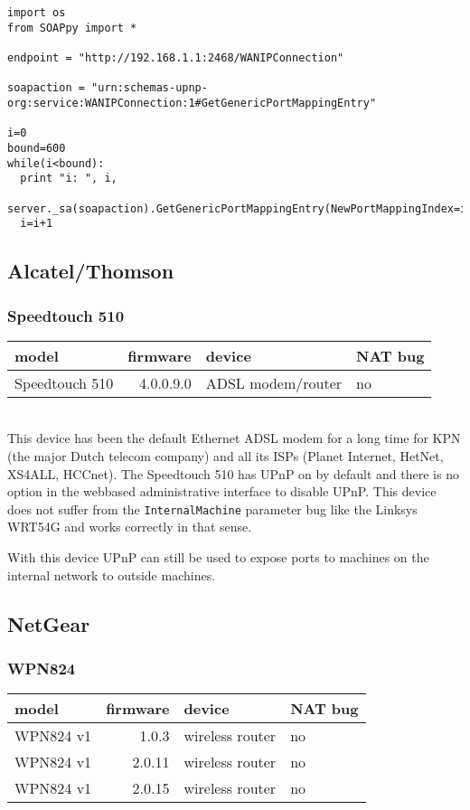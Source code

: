 \documentclass[10pt]{article}
\begin{document}
\begin{verbatim}
import os
from SOAPpy import *

endpoint = "http://192.168.1.1:2468/WANIPConnection"

soapaction = "urn:schemas-upnp-org:service:WANIPConnection:1#GetGenericPortMappingEntry"

i=0
bound=600
while(i<bound):
  print "i: ", i,
    server._sa(soapaction).GetGenericPortMappingEntry(NewPortMappingIndex=i)
  i=i+1
\end{verbatim}


\subsection{Alcatel/Thomson}

\subsubsection{Speedtouch 510}

\begin{tabular}{|l|r|l|l|}
\hline
model & firmware & device & NAT bug \\
\hline
Speedtouch 510 & 4.0.0.9.0 & ADSL modem/router & no \\
\hline
\end{tabular} \\

This device has been the default Ethernet ADSL modem for a long time for
KPN (the major Dutch telecom company) and all its ISPs (Planet Internet,
HetNet, XS4ALL, HCCnet). The Speedtouch 510 has UPnP on by default and there
is no option in the webbased administrative interface to disable UPnP. This
device does not suffer from the \texttt{InternalMachine} parameter bug like
the Linksys WRT54G and works correctly in that sense.

With this device UPnP can still be used to expose ports to machines on the
internal network to outside machines.

\subsection{NetGear}

\subsubsection{WPN824}

\begin{tabular}{|l|r|l|l|}
\hline
model & firmware & device & NAT bug \\
\hline
WPN824 v1 & 1.0.3 & wireless router & no \\
\hline
WPN824 v1 & 2.0.11 & wireless router & no \\
\hline
WPN824 v1 & 2.0.15 & wireless router & no \\
\hline
\end{tabular} \\
\end{document}
